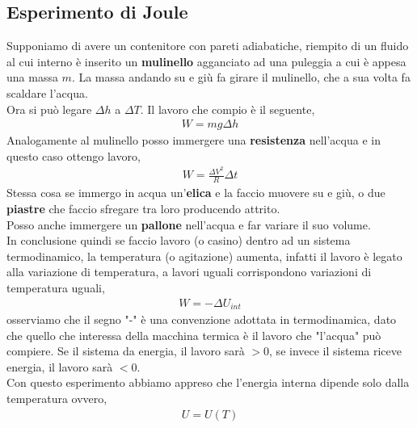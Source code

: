     \subsection{Esperimento di Joule}
        Supponiamo di avere un contenitore con pareti adiabatiche, riempito di un fluido al cui interno è inserito un \textbf{mulinello} agganciato ad una puleggia a cui è appesa una massa $m$. La massa andando su e giù fa girare il mulinello, che a sua volta fa scaldare l'acqua.\\
        Ora si può legare $\Delta h$ a $\Delta T$. Il lavoro che compio è il seguente,
        \begin{align*}
            W=mg\Delta h
        \end{align*}
        Analogamente al mulinello posso immergere una \textbf{resistenza} nell'acqua e in questo caso ottengo lavoro,
        \begin{align*}
            W=\frac{\Delta V^2}{R}\Delta t
        \end{align*}
        Stessa cosa se immergo in acqua un'\textbf{elica} e la faccio muovere su e giù, o due \textbf{piastre} che faccio sfregare tra loro producendo attrito.\\
        Posso anche immergere un \textbf{pallone} nell'acqua e far variare il suo volume.\\
        In conclusione quindi se faccio lavoro (o casino) dentro ad un sistema termodinamico, la temperatura (o agitazione) aumenta, infatti il lavoro è legato alla variazione di temperatura, a lavori uguali corrispondono variazioni di temperatura uguali,
        \begin{align*}
            W=-\Delta U_{int}
        \end{align*}
        osserviamo che il segno "-" è una convenzione adottata in termodinamica, dato che quello che interessa della macchina termica è il lavoro che "l'acqua" può compiere. Se il sistema da energia, il lavoro sarà $>0$, se invece il sistema riceve energia, il lavoro sarà $<0$.\\
        Con questo esperimento abbiamo appreso che l'energia interna dipende solo dalla temperatura ovvero,
        \begin{align*}
            U = U(T)
        \end{align*}

